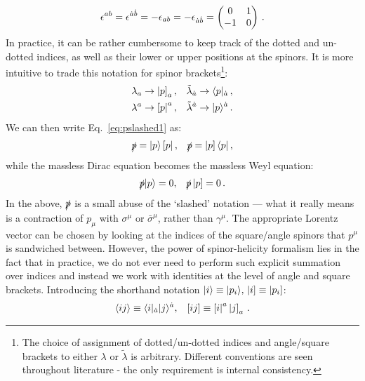 \documentclass[main.tex]{subfiles}
\begin{document}
\begin{equation}
    \epsilon^{ab} = \epsilon^{\dot{a}\dot{b}} = -\epsilon_{ab} = -\epsilon_{\dot{a}\dot{b}} = 
    \begin{pmatrix}
        0 & 1 \\
        -1 & 0
    \end{pmatrix}\,.
\end{equation}
In practice, it can be rather cumbersome to keep track of the dotted and un-dotted indices, as well as their lower or upper positions at the spinors. It is more intuitive to trade this notation for spinor brackets\footnote{The choice of assignment of dotted/un-dotted indices and angle/square brackets to either $\lambda$ or $\tilde{\lambda}$ is arbitrary. Different conventions are seen throughout literature - the only requirement is internal consistency.}:
\begin{align} \label{eq:lambdatobraket}
    \lambda_a  &\rightarrow \left| p \right]_a,  &&\tilde{\lambda}_{\dot{a}} \rightarrow \langle p|_{\dot{a}}\,, \nonumber \\*
    \lambda^a  &\rightarrow \left[ p \right|^a,  &&\tilde{\lambda}^{\dot{a}} \rightarrow |p \rangle^{\dot{a}} \,.
\end{align}
We can then write Eq.~\ref{eq:pslashed1} as:
\begin{align} \label{eq:pslashed2}
    \slashed{p} = |p \rangle\left[ p \right|, && \slashed{p} = \left| p \right] \langle p| \,,
\end{align}
while the massless Dirac equation becomes the massless Weyl equation:
\begin{align} \label{eq:weyleq}
    \slashed{p}|p \rangle = 0, && \slashed{p}\left| p \right] = 0\,.
\end{align}
In the above, $\slashed{p}$ is a small abuse of the `slashed' notation --- what it really means is a contraction of $p_\mu$ with $\sigma^\mu$ or $\bar{\sigma}^\mu$, rather than $\gamma^\mu$. The appropriate Lorentz vector can be chosen by looking at the indices of the square/angle spinors that $p^\mu$ is sandwiched between. However, the power of spinor-helicity formalism lies in the fact that in practice, we do not ever need to perform such explicit summation over indices and instead we work with identities at the level of angle and square brackets. Introducing the shorthand notation $|i \rangle \equiv |p_i \rangle,\, \left| i \right] \equiv \left| p_i \right]$: 
\begin{align}
    \langle ij \rangle \equiv \langle i|_{\dot{a}} |j \rangle^{\dot{a}}, && [ ij ] \equiv \left[ i \right|^a \left| j \right]_a \,. 
\end{align}
\end{document}
